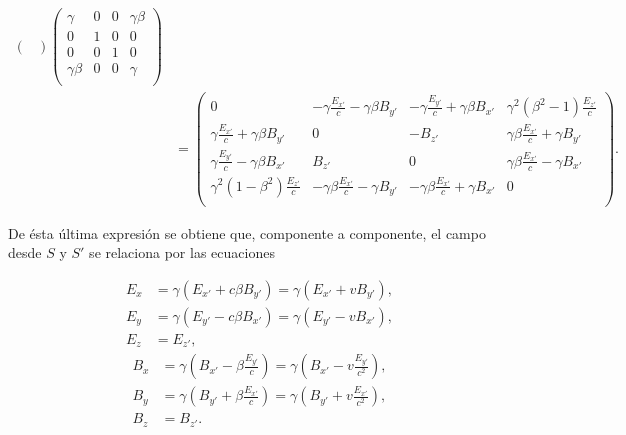 \documentclass[a4paper,10pt]{article}
\begin{document}
\begin{subequations}
\begin{align}
\begin{pmatrix}
\end{pmatrix}
\begin{pmatrix}
		\gamma			&	0	&	0	&	\gamma\beta	\\
		0						&	1	&	0	&	0						\\
		0						&	0	&	1	&	0						\\
		\gamma\beta	&	0	&	0	&	\gamma			\\
\end{pmatrix}\\
&=
\begin{pmatrix}
		0	&	-\gamma\frac{E_{x'}}{c}-\gamma\beta B_{y'}	&	-\gamma\frac{E_{y'}}{c}+\gamma\beta B_{x'}	&	\gamma^2(\beta^2-1)\frac{E_{z'}}{c}	\\
		\gamma\frac{E_{x'}}{c}+\gamma\beta B_{y'}			&	0	&	-B_{z'}							&	\gamma\beta\frac{E_{x'}}{c}+\gamma B_{y'}					\\
		\gamma\frac{E_{y'}}{c}-\gamma\beta B_{x'}			&	B_{z'}	&	0							&	\gamma\beta\frac{E_{x'}}{c}-\gamma B_{x'}					\\
		\gamma^2(1-\beta^2)\frac{E_{z'}}{c}	& 	-\gamma\beta\frac{E_{x'}}{c}- \gamma B_{y'}	&	-\gamma\beta\frac{E_{x'}}{c}+\gamma B_{x'}	&	0	\\
\end{pmatrix}.
\end{align}
\label{Eq1.4}
\end{subequations}

De ésta última expresión se obtiene que, componente a componente, el campo desde $S$ y $S'$ se relaciona por las ecuaciones

\begin{subequations}
\begin{align}
E_x	&=\gamma (E_{x'}+c\beta B_{y'})=\gamma (E_{x'}+vB_{y'}),	\\
E_y	&=\gamma (E_{y'}-c\beta	B_{x'})=\gamma (E_{y'}-vB_{x'}),	\\
E_z	&=E_{z'},
\end{align}
\label{Eq1.5}
\end{subequations}
\begin{subequations}
\begin{align}
B_x	&=\gamma (B_{x'}-\beta\frac{E_{y'}}{c})=\gamma (B_{x'}-v\frac{E_{y'}}{c^2}),		\\
B_y	&=\gamma (B_{y'}+\beta\frac{E_{x'}}{c})=\gamma (B_{y'}+v\frac{E_{x'}}{c^2}),	\\
B_z	&=B_{z'}.
\end{align}
\label{Eq1.6}
\end{subequations}
\end{document}
